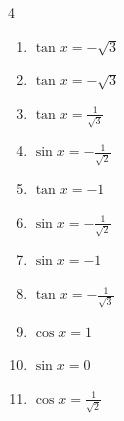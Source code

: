 \begin{multicols}{4}
\begin{enumerate}

  \item $\displaystyle \tan{x}  = -\sqrt{3}$


  \item $\displaystyle \tan{x}  = -\sqrt{3}$


  \item $\displaystyle \tan{x}  = \frac{1}{\sqrt{3}}$


  \item $\displaystyle \sin{x}  = -\frac{1}{\sqrt{2}}$


  \item $\displaystyle \tan{x}  = -1$


  \item $\displaystyle \sin{x}  = -\frac{1}{\sqrt{2}}$


  \item $\displaystyle \sin{x}  = -1$


  \item $\displaystyle \tan{x}  = -\frac{1}{\sqrt{3}}$


  \item $\displaystyle \cos{x}  = 1$


  \item $\displaystyle \sin{x}  = 0$


  \item $\displaystyle \cos{x}  = \frac{1}{\sqrt{2}}$



\end{enumerate}
\end{multicols}
